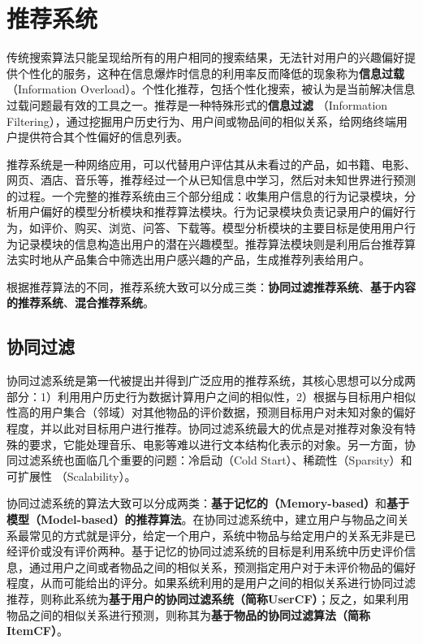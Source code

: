 \chapter{推荐系统}
传统搜索算法只能呈现给所有的用户相同的搜索结果，无法针对用户的兴趣偏好提供个性化的服务，这种在信息爆炸时信息的利用率反而降低的现象称为\textbf{信息过载}
（Information Overload）。个性化推荐，包括个性化搜索，被认为是当前解决信息过载问题最有效的工具之一。推荐是一种特殊形式的\textbf{信息过滤}
（Information Filtering），通过挖掘用户历史行为、用户间或物品间的相似关系，给网络终端用户提供符合其个性偏好的信息列表。

推荐系统是一种网络应用，可以代替用户评估其从未看过的产品，如书籍、电影、网页、酒店、音乐等，推荐经过一个从已知信息中学习，然后对未知世界进行预测的过程。一个完整的推荐系统由三个部分组成：收集用户信息的行为记录模块，分析用户偏好的模型分析模块和推荐算法模块。行为记录模块负责记录用户的偏好行为，如评价、购买、浏览、问答、下载等。模型分析模块的主要目标是使用用户行为记录模块的信息构造出用户的潜在兴趣模型。推荐算法模块则是利用后台推荐算法实时地从产品集合中筛选出用户感兴趣的产品，生成推荐列表给用户。

根据推荐算法的不同，推荐系统大致可以分成三类：\textbf{协同过滤推荐系统}、\textbf{基于内容的推荐系统}、\textbf{混合推荐系统}。

\ornamento
\section{协同过滤}
协同过滤系统是第一代被提出并得到广泛应用的推荐系统，其核心思想可以分成两部分：1）利用用户历史行为数据计算用户之间的相似性，2）根据与目标用户相似性高的用户集合（邻域）对其他物品的评价数据，预测目标用户对未知对象的偏好程度，并以此对目标用户进行推荐。协同过滤系统最大的优点是对推荐对象没有特殊的要求，它能处理音乐、电影等难以进行文本结构化表示的对象。另一方面，协同过滤系统也面临几个重要的问题：冷启动（Cold Start）、稀疏性（Sparsity）和可扩展性
（Scalability）。

协同过滤系统的算法大致可以分成两类：\textbf{基于记忆的（Memory-based）}和\textbf{基于模型（Model-based）的推荐算法}。在协同过滤系统中，建立用户与物品之间关系最常见的方式就是评分，给定一个用户，系统中物品与给定用户的关系无非是已经评价或没有评价两种。基于记忆的协同过滤系统的目标是利用系统中历史评价信息，通过用户之间或者物品之间的相似关系，预测指定用户对于未评价物品的偏好程度，从而可能给出的评分。如果系统利用的是用户之间的相似关系进行协同过滤推荐，则称此系统为\textbf{基于用户的协同过滤系统（简称UserCF）}；反之，如果利用物品之间的相似关系进行预测，则称其为\textbf{基于物品的协同过滤算法（简称ItemCF）}。

